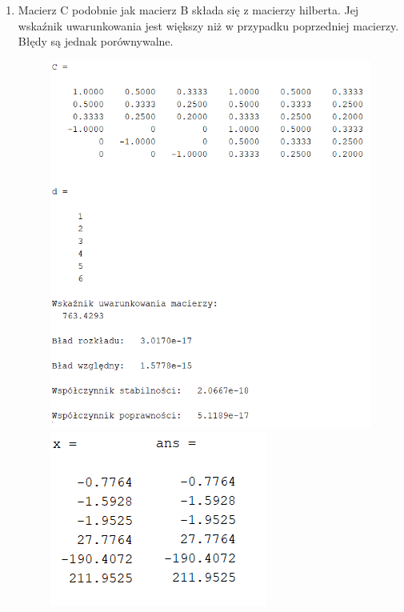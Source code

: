 \documentclass[11pt]{article}
\begin{document}
\begin{enumerate}
    \item Macierz C podobnie jak macierz B składa się z macierzy hilberta. Jej wskaźnik uwarunkowania jest większy niż w przypadku poprzedniej macierzy. Błędy są jednak porównywalne.
    \begin{figure}[h]
        \centering
        \includegraphics[scale=0.8]{C1}
        \includegraphics[scale=0.9]{C2}
    \end{figure}
    
    \break


\end{enumerate}
\end{document}
